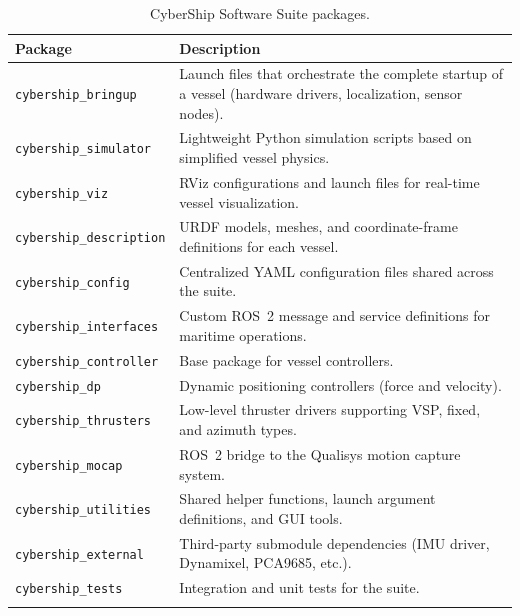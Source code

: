 \documentclass[12pt,a4paper]{article}
\begin{document}
	\begin{longtable}{@{}p{5.2cm}p{8.8cm}@{}}
		\toprule
		\textbf{Package}                & \textbf{Description}                                                                                           \\
		\midrule
		\endhead
		\texttt{cybership\_bringup}     & Launch files that orchestrate the complete startup of a vessel (hardware drivers, localization, sensor nodes). \\
		\addlinespace
		\texttt{cybership\_simulator}   & Lightweight Python simulation scripts based on simplified vessel physics.                                      \\
		\addlinespace
		\texttt{cybership\_viz}         & RViz configurations and launch files for real-time vessel visualization.                                       \\
		\addlinespace
		\texttt{cybership\_description} & URDF models, meshes, and coordinate-frame definitions for each vessel.                                         \\
		\addlinespace
		\texttt{cybership\_config}      & Centralized YAML configuration files shared across the suite.                                                  \\
		\addlinespace
		\texttt{cybership\_interfaces}  & Custom ROS~2 message and service definitions for maritime operations.                                          \\
		\addlinespace
		\texttt{cybership\_controller}  & Base package for vessel controllers.                                                                           \\
		\addlinespace
		\texttt{cybership\_dp}          & Dynamic positioning controllers (force and velocity).                                                          \\
		\addlinespace
		\texttt{cybership\_thrusters}   & Low-level thruster drivers supporting VSP, fixed, and azimuth types.                                           \\
		\addlinespace
		\texttt{cybership\_mocap}       & ROS~2 bridge to the Qualisys motion capture system.                                                            \\
		\addlinespace
		\texttt{cybership\_utilities}   & Shared helper functions, launch argument definitions, and GUI tools.                                           \\
		\addlinespace
		\texttt{cybership\_external}    & Third-party submodule dependencies (IMU driver, Dynamixel, PCA9685, etc.).                                     \\
		\addlinespace
		\texttt{cybership\_tests}       & Integration and unit tests for the suite.                                                                      \\
		\bottomrule
		\caption{CyberShip Software Suite packages.}
		\label{tab:packages}
	\end{longtable}
	
\end{document}
